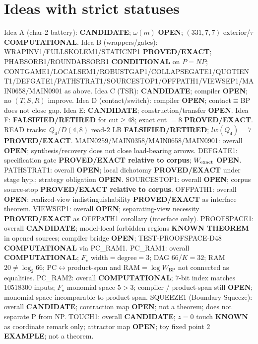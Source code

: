 \documentclass[11pt]{article}
\begin{document}
\section*{Ideas with strict statuses}
Idea A (char-2 battery): \textbf{CANDIDATE}; $\omega(m)$ \textbf{OPEN}; $(331,7,7)$ exterior/$\tau$ \textbf{COMPUTATIONAL}.
Idea B (wrappers/gates): WRAPINV1/FULLSKOLEM1/STATICNP1 \textbf{PROVED/EXACT};
PHABSORB1/ROUNDABSORB1 \textbf{CONDITIONAL} on $P=NP$;
CONTGAME1/LOCALSEM1/ROBUSTGAP1/COLLAPSEGATE1/QUOTIENT1/DEFGATE1/PATHSTRAT1/SOURCESTOP1/OFFPATH1/VIEWSEP1/MAIN0658/MAIN0901 as above.
Idea C (TSR): \textbf{CANDIDATE}; compiler \textbf{OPEN}; no $(T,S,R)$ improve.
Idea D (contact/switch): compiler \textbf{OPEN}; contact$\equiv$BP does not close gap.
Idea E: \textbf{CANDIDATE}; construction/transfer \textbf{OPEN}.
Idea F: \textbf{FALSIFIED/RETIRED} for cut$\ge48$; exact cut $=8$ \textbf{PROVED/EXACT}.
READ tracks: $Q_4$/$D(4,8)$ read-$2$ LB \textbf{FALSIFIED/RETIRED}; $lw(Q_4)=7$ \textbf{PROVED/EXACT}.
MAIN0259/MAIN0358/MAIN0658/MAIN0901: overall \textbf{OPEN}; synthesis/recovery does not close load-bearing arrows.
DEFGATE1: specification gate \textbf{PROVED/EXACT relative to corpus}; $W_{\rm exact}$ \textbf{OPEN}.
PATHSTRAT1: overall \textbf{OPEN}; local dichotomy \textbf{PROVED/EXACT} under stage hyp.; strategy obligation \textbf{OPEN}.
SOURCESTOP1: overall \textbf{OPEN}; corpus source-stop \textbf{PROVED/EXACT relative to corpus}.
OFFPATH1: overall \textbf{OPEN}; realized-view indistinguishability \textbf{PROVED/EXACT} as interface theorem.
VIEWSEP1: overall \textbf{OPEN}; separating-view necessity \textbf{PROVED/EXACT} as OFFPATH1 corollary (interface only).
PROOFSPACE1: overall \textbf{CANDIDATE}; model-local forbidden regions \textbf{KNOWN THEOREM} in opened sources;
compiler bridge \textbf{OPEN}; TEST-PROOFSPACE-D48 \textbf{COMPUTATIONAL} via PC\_RAM1.
PC\_RAM1: overall \textbf{COMPUTATIONAL}; $F_\star$ width$=$degree$=3$; DAG $66$/$K{=}32$; RAM $20\neq\log_2 66$;
PC$\leftrightarrow$product-span and RAM$=\log W_{\mathrm{BP}}$ not connected as equalities.
PC\_RAM2: overall \textbf{COMPUTATIONAL}; $7$-bit index matches $10518300$ inputs; $F_\star$ monomial space $5>3$;
compiler / product-span still \textbf{OPEN}; monomial space incomparable to product-span.
SQUEEZE1 (Boundary-Squeeze): overall \textbf{CANDIDATE}; contraction map \textbf{OPEN}; not a theorem;
does not separate P from NP.
TOUCH1: overall \textbf{CANDIDATE}; $z{=}0$ touch \textbf{KNOWN} as coordinate remark only; attractor map \textbf{OPEN}; toy fixed point $2$ \textbf{EXAMPLE}; not a theorem.
\end{document}
